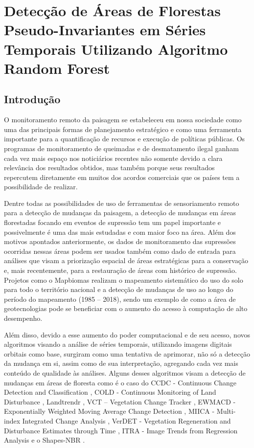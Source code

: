 
\section{Detecção de Áreas de Florestas Pseudo-Invariantes em Séries Temporais Utilizando Algoritmo Random Forest}

\subsection{Introdução}

\hspace{13pt} O monitoramento remoto da paisagem se estabeleceu em nossa sociedade como uma das principais formas de planejamento estratégico e como uma ferramenta importante para a quantificação de recursos e execução de políticas públicas. Os programas de monitoramento de queimadas e de desmatamento ilegal ganham cada vez mais espaço nos noticiários recentes não somente devido a clara relevância dos resultados obtidos, mas também porque seus resultados repercutem diretamente em muitos dos acordos comerciais que os países tem a possibilidade de realizar. 

Dentre todas as possibilidades de uso de ferramentas de sensoriamento remoto para a detecção de mudanças da paisagem, a detecção de mudanças em áreas florestadas focando em eventos de supressão tem um papel importante e possivelmente é uma das mais estudadas e com maior foco na área. Além dos motivos apontados anteriormente, os dados de monitoramento das supressões ocorridas nessas áreas podem ser usados também como dado de entrada para análises que visam a priorização espacial de áreas estratégicas para a conservação e, mais recentemente, para a restauração de áreas com histórico de supressão. Projetos como o Mapbiomas \citep{Souza2019} realizam o mapeamento sistemático do uso do solo para todo o território nacional e a detecção de mudanças de uso ao longo do período do mapeamento (1985 – 2018), sendo um exemplo de como a área de geotecnologias pode se beneficiar com o aumento do acesso à computação de alto desempenho. 

Além disso, devido a esse aumento do poder computacional e de seu acesso, novos algoritmos visando a análise de séries temporais, utilizando imagens digitais orbitais como base, surgiram como uma tentativa de aprimorar, não só a detecção da mudança em si, assim como de sua interpretação, agregando cada vez mais conteúdo de qualidade às análises. Alguns desses algoritmos visam a detecção de mudanças em áreas de floresta como é o caso do CCDC - Continuous Change Detection and Classification \citep{ZHU2014152}, COLD - Continuous Monitoring of Land Disturbance \citep{Cohen2020}, Landtrendr \citep{KENNEDY20102897, KENNEDY2012117}, VCT – Vegetation Change Tracker \citep{Huang2010, THOMAS201119}, EWMACD - Exponentially Weighted Moving Average Change Detection \citep{Brooks2014}, MIICA - Multi-index Integrated Change Analysis \citep{JIN2013159}, VerDET - Vegetation Regeneration and Disturbance Estimates through Time \citep{Hughes2017}, ITRA - Image Trends from Regression Analysis \citep{VOGELMANN201292} e o Shapes-NBR \citep{Meyer2013, Moisen2016}.

